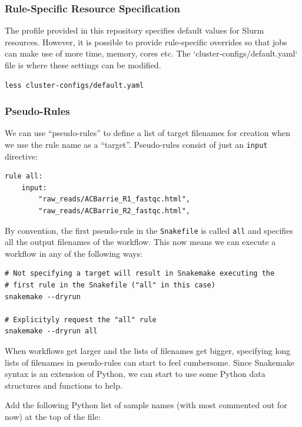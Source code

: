\subsubsection{Rule-Specific Resource Specification}

The profile provided in this repository specifies default values for Slurm resources. However, it is possible to provide
rule-specific overrides so that jobs can make use of more time, memory, cores etc. The `cluster-configs/default.yaml` file is where
these settings can be modified.

\begin{lstlisting}
less cluster-configs/default.yaml
\end{lstlisting}

\subsubsection{Pseudo-Rules}

We can use ``pseudo-rules'' to define a list of target filenames for creation when we use the rule name as a ``target''. Pseudo-rules consist of just an \texttt{input} directive:

\begin{lstlisting}
rule all:
	input:
		"raw_reads/ACBarrie_R1_fastqc.html",
		"raw_reads/ACBarrie_R2_fastqc.html",
\end{lstlisting}

By convention, the first pseudo-rule in the \texttt{Snakefile} is called \texttt{all} and specifies all the output filenames of the workflow. This now
means we can execute a workflow in any of the following ways:

\begin{lstlisting}
# Not specifying a target will result in Snakemake executing the
# first rule in the Snakefile ("all" in this case)
snakemake --dryrun

# Explicityly request the "all" rule
snakemake --dryrun all
\end{lstlisting}

When workflows get larger and the lists of filenames get bigger, specifying long lists of filenames in pseudo-rules can start to feel cumbersome.
Since Snakemake syntax is an extension of Python, we can start to use some Python data structures and functions to help.

Add the following Python list of sample names (with most commented out for now) at the top of the file:

